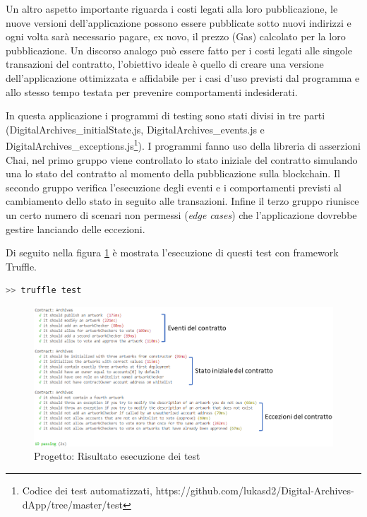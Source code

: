 Un altro aspetto importante riguarda i costi legati alla loro pubblicazione, le nuove versioni dell'applicazione possono essere pubblicate sotto nuovi indirizzi e ogni volta sarà necessario pagare, ex novo, il prezzo (Gas) calcolato per la loro pubblicazione. Un discorso analogo può essere fatto per i costi legati alle singole transazioni del contratto, l'obiettivo ideale è quello di creare una versione dell'applicazione ottimizzata e affidabile per i casi d'uso previsti dal programma e allo stesso tempo testata per prevenire comportamenti indesiderati.

In questa applicazione i programmi di testing sono stati divisi in tre parti (DigitalArchives\_initialState.js, DigitalArchives\_events.js e DigitalArchives\_exceptions.js{\footnote{Codice dei test automatizzati, https://github.com/lukasd2/Digital-Archives-dApp/tree/master/test}}). I programmi fanno uso della libreria di asserzioni Chai, nel primo gruppo viene controllato lo stato iniziale del contratto simulando una lo stato del contratto al momento della pubblicazione sulla blockchain. Il secondo gruppo verifica l'esecuzione degli eventi e i comportamenti previsti al cambiamento dello stato in seguito alle transazioni. Infine il terzo gruppo riunisce un certo numero di scenari non permessi (\emph{edge cases}) che l'applicazione dovrebbe gestire lanciando delle eccezioni.

Di seguito nella figura \ref{fig:contractTests} è mostrata l'esecuzione di questi test con framework Truffle.
\\
\begin{lstlisting}[caption={Truffle esecuzione di test},language=JavaScript]
>> truffle test
\end{lstlisting}

\begin{figure}[H]
\centering
\includegraphics[width=1\textwidth]{immagini/testContratti.png}
\caption{Progetto: Risultato esecuzione dei test}
\label{fig:contractTests}
\end{figure}

